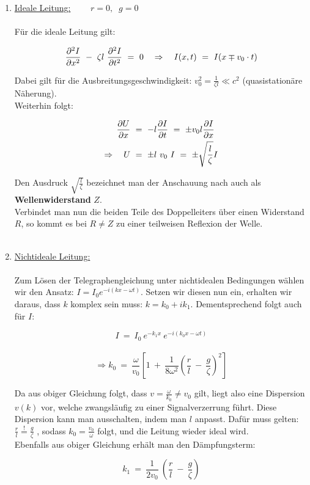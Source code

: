 \begin{enumerate}[label=\roman*]
\item \underline{Ideale Leitung:} $\qquad r=0, \; \; g=0$
\ \\
\ \\
Für die ideale Leitung gilt:

\begin{equation*}
\pddiff{I}{x} \ - \ \zeta l \ \pddiff{I}{t} \ = \  	0 \quad \Rightarrow\quad I(x,t)  \ = \ I(x \mp v_0\cdot t)
\end{equation*}

Dabei gilt für die Ausbreitungsgeschwindigkeit: $v_0^2 = \frac{1}{\zeta l} \ll c^2$ (quasistationäre Näherung).\\
Weiterhin folgt:

\begin{align*}
\frac{\partial{U}}{\partial{x}} \ &= \ - l\frac{\partial{I}}{\partial{t}} \ = \ \pm v_0 l \frac{\partial{I}}{\partial{x}}\\
\Rightarrow \quad U \ &= \ \pm l \ v_0 \ I  \ = \ \pm \sqrt{\frac{l}{\zeta}}I 
\end{align*}

Den Ausdruck $\sqrt{\frac{l}{\zeta}}$ bezeichnet man der Anschauung nach auch als \textbf{Wellenwiderstand} $Z$.\\
Verbindet man nun die beiden Teile des Doppelleiters über einen Widerstand $R$, so kommt es bei $R\neq Z$ zu einer teilweisen Reflexion der Welle.\\
\ \\
\item \underline{Nichtideale Leitung:}
\ \\
\ \\

Zum Lösen der Telegraphengleichung unter nichtidealen Bedingungen wählen wir den Ansatz: $I=I_0 e^{-i(kx-\omega t)}$. Setzen wir diesen nun ein, erhalten wir daraus, dass $k$ komplex sein muss: $k=k_0 + ik_1$. Dementsprechend folgt auch für $I$:

\begin{equation*}
I  \ = \ I_0 \ e^{-k_1 x} \ e^{-i(k_0 x -\omega t)}
\end{equation*}
\ \\
\begin{equation*}
\Rightarrow k_0  \ = \ \frac{\omega}{v_0}\left[1 \ + \ \frac{1}{8\omega^2}\left(\frac{r}{l} \ - \ \frac{g}{\zeta}\right)^2\right]
\end{equation*}

Da aus obiger Gleichung folgt, dass $v= \frac{\omega}{k_0}\neq v_0$ gilt, liegt also eine Dispersion $v(k)$ vor, welche zwangsläufig zu einer Signalverzerrung führt. Diese Dispersion kann man \grqq ausschalten\grqq , indem man  $l$ anpasst. Dafür muss gelten: $\frac{r}{l} \overset{!}{=}   \frac{g}{\zeta}$ , sodass $k_0 =\frac{v_0}{\omega}$ folgt, und die Leitung wieder ideal wird.\\
Ebenfalls aus obiger Gleichung erhält man den Dämpfungsterm:

\begin{equation*}
k_1  \ = \ \frac{1}{2v_0} \ \left(\frac{r}{l} \ - \ \frac{g}{\zeta}\right)
\end{equation*}
\end{enumerate}

